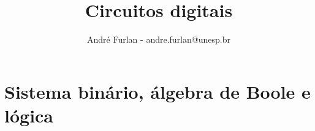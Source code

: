 

\title{Circuitos digitais}


\author{André Furlan - andre.furlan@unesp.br}

\date{\the\year}


	
	\frame{\titlepage}
	
	\section{Sistema binário, álgebra de Boole e lógica}
		

%		
	
